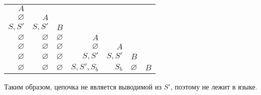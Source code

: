 \documentclass[12pt]{article}
\newenvironment{Problems}{
	\begin{enumerate}[]
	}{       
	\end{enumerate}
}
\begin{document}
\begin{Problems}
	\begin{center}
		\begin{tabular}{|r|r|r|r|r|r|r|}
			\cline{1-1}
			$A$\\
			\cline{1-2}
			$\varnothing$ & $A$\\
			\cline{1-3}
			$S, S'$ & $S, S'$ & $B$\\
			\cline{1-4}
			$\varnothing$ & $\varnothing$ & $\varnothing$ & $A$\\
			\cline{1-5}
			$\varnothing$ & $\varnothing$ & $\varnothing$ & $\varnothing$ & $A$\\
			\cline{1-6}
			$\varnothing$ & $\varnothing$ & $\varnothing$ & $S, S'$ & $S, S'$ & $B$\\
			\hline
			$\varnothing$ & $\varnothing$ & $\varnothing$ & $S, S', S_b$ & $S_b$& $\varnothing$ & $B$\\
			\hline
		\end{tabular}
	\end{center}
	Таким образом, цепочка не является выводимой из $S'$, поэтому не лежит в языке.
	\end{Problems}
	
\end{document}
